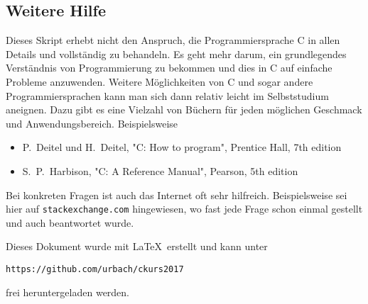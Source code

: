 \subsection{Weitere Hilfe}

Dieses Skript erhebt nicht den Anspruch, die Programmiersprache C in allen Details und vollständig zu behandeln.
Es geht mehr darum, ein grundlegendes Verständnis von Programmierung zu bekommen und dies in C auf einfache Probleme anzuwenden.
Weitere Möglichkeiten von C und sogar andere Programmiersprachen kann man sich dann relativ leicht im Selbststudium aneignen.
Dazu gibt es eine Vielzahl von Büchern für jeden möglichen Geschmack und Anwendungsbereich.
Beispielsweise
\begin{itemize}
\item P.~Deitel und H.~Deitel, "C: How to program", Prentice Hall, 7th edition
\item S.~P.~Harbison, "C: A Reference Manual", Pearson, 5th edition
\end{itemize}
Bei konkreten Fragen ist auch das Internet oft sehr hilfreich.
Beispielsweise sei hier auf \texttt{stackexchange.com} hingewiesen, wo fast jede Frage schon einmal gestellt und auch beantwortet wurde.

Dieses Dokument wurde mit \LaTeX\ erstellt und kann unter 
\begin{center}
  \texttt{https://github.com/urbach/ckurs2017} 
\end{center}
frei heruntergeladen werden.
